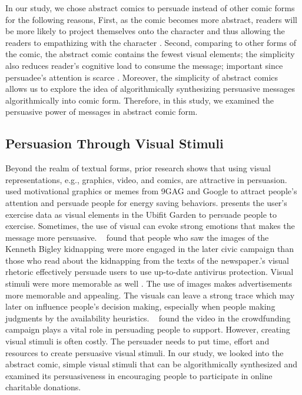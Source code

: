 In our study, we chose abstract comics to persuade instead of other comic forms for the following reasons, First, as the comic becomes more abstract, readers will be more likely to project themselves onto the character and thus allowing the readers to empathizing with the character \cite{scott1993understanding}. Second, comparing to other forms of the comic, the abstract comic contains the fewest visual elements; the simplicity also reduces reader's cognitive load to consume the message; important since persuadee's attention is scarce \cite{Janssen2016}. Moreover, the simplicity of abstract comics allows us to explore the idea of algorithmically synthesizing persuasive messages algorithmically into comic form. Therefore, in this study, we examined the persuasive power of messages in abstract comic form.

\subsection{Persuasion Through Visual Stimuli}
Beyond the realm of textual forms, prior research shows that using visual representations, e.g., graphics, video, and comics, are attractive in persuasion. \textcite{selker2015sweetbuildinggreeter} used motivational graphics or memes from 9GAG and Google to attract people's attention and persuade people for energy saving behaviors. \textcite{consolvo2008activity} presents the user's exercise data as visual elements in the Ubifit Garden to persuade people to exercise. Sometimes, the use of visual can evoke strong emotions that makes the message more persuasive. ~\textcite{iyer2006picture} found that people who saw the images of the Kenneth Bigley kidnapping were more engaged in the later civic campaign than those who read about the kidnapping from the texts of the newspaper.\textcite{zhang2014stop}'s visual rhetoric effectively persuade users to use up-to-date antivirus protection. Visual stimuli were more memorable as well \cite{nisbett1980human}. The use of images makes advertisements more memorable and appealing. The visuals can leave a strong trace which may later on influence people's decision making, especially when people making judgments by the availability heuristics. ~\textcite{dey2017art} found the video in the crowdfunding campaign plays a vital role in persuading people to support. However, creating visual stimuli is often costly. The persuader needs to put time, effort and resources to create persuasive visual stimuli. In our study, we looked into the abstract comic, simple visual stimuli that can be algorithmically synthesized and examined its persuasiveness in encouraging people to participate in online charitable donations. 
